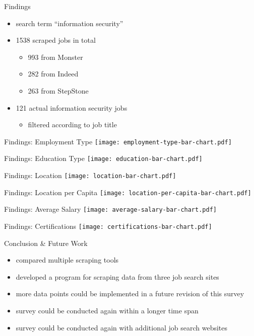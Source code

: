 \documentclass[aspectratio=169]{beamer}
\begin{document}
  \begin{frame}{Findings}
    \begin{itemize}
      \item search term “information security”
      \item 1538 scraped jobs in total
      \begin{itemize}
        \item 993 from Monster
        \item 282 from Indeed
        \item 263 from StepStone
      \end{itemize}
      \item 121 actual information security jobs
        \begin{itemize}
          \item filtered according to job title
        \end{itemize}
    \end{itemize}
  \end{frame}

  \begin{frame}{Findings: Employment Type}
    \texttt{[image: employment-type-bar-chart.pdf]}
  \end{frame}

  \begin{frame}{Findings: Education Type}
    \texttt{[image: education-bar-chart.pdf]}
  \end{frame}

  \begin{frame}{Findings: Location}
    \texttt{[image: location-bar-chart.pdf]}
  \end{frame}

  \begin{frame}{Findings: Location per Capita}
    \texttt{[image: location-per-capita-bar-chart.pdf]}
  \end{frame}

  \begin{frame}{Findings: Average Salary}
    \texttt{[image: average-salary-bar-chart.pdf]}
  \end{frame}

  \begin{frame}{Findings: Certifications}
    \texttt{[image: certifications-bar-chart.pdf]}
  \end{frame}

  \begin{frame}{Conclusion \& Future Work}
    \begin{itemize}
      \item compared multiple scraping tools
      \item developed a program for scraping data from three job search sites
      \item more data points could be implemented in a future revision of this survey
      \item survey could be conducted again within a longer time span
      \item survey could be conducted again with additional job search websites
    \end{itemize}
  \end{frame}
\end{document}
